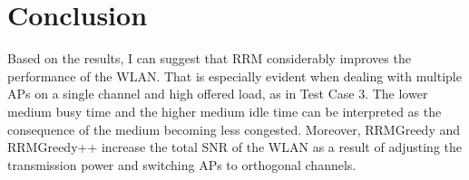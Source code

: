     
    


\section{Conclusion}
\label{chap:impl:sec:conclusion}

Based on the results, I can suggest that RRM considerably improves the performance of the WLAN. That is especially evident when dealing with multiple APs on a single channel and high offered load, as in Test Case 3. The lower medium busy time and the higher medium idle time can be interpreted as the consequence of the medium becoming less congested. Moreover, RRMGreedy and RRMGreedy++ increase the total SNR of the WLAN as a result of adjusting the transmission power and switching APs to orthogonal channels.

